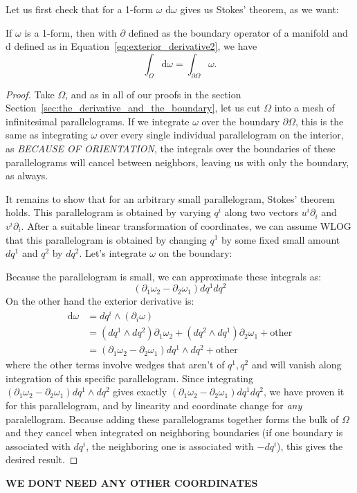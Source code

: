 	Let us first check that for a 1-form $\omega$ $\mathrm d \omega$ gives us Stokes' theorem, as we want:
	
	\begin{theorem}
		If $\omega$ is a 1-form, then with $\partial$ defined as the boundary operator of a manifold and $\mathrm d$ defined as in Equation~\eqref{eq:exterior_derivative2}, we have
		\begin{equation*} 
			\int_\Omega \mathrm d \omega = \int_{\partial \Omega} \omega.
		\end{equation*}
	\end{theorem}
	\begin{proof}
		Take $\Omega$, and as in all of our proofs in the section Section~\ref{sec:the_derivative_and_the_boundary}, let us cut $\Omega$ into a mesh of infinitesimal parallelograms. If we integrate $\omega$ over the boundary $\partial \Omega$, this is the same as integrating $\omega$ over every single individual parallelogram on the interior, as \emph{BECAUSE OF ORIENTATION}, the integrals over the boundaries of these parallelograms will cancel between neighbors, leaving us with only the boundary, as always.
		
		It remains to show that for an arbitrary small parallelogram, Stokes' theorem holds. This parallelogram is obtained by varying $q^i$ along two vectors $u^i \partial_i$ and $v^i \partial_i$. After a suitable linear transformation of coordinates, we can assume WLOG that this parallelogram is obtained by changing $q^1$ by some fixed small amount $dq^1$ and $q^2$ by $dq^2$. Let's integrate $\omega$ on the boundary:
		
		Because the parallelogram is small, we can approximate these integrals as:
		\begin{equation*}
			(\partial_1 \omega_2 - \partial_2 \omega_1) dq^1 dq^2
		\end{equation*}
		On the other hand the exterior derivative is:
		\begin{align*}
			\mathrm d \omega 
			&= dq^i \wedge (\partial_i \omega) \\
			&= (dq^1 \wedge dq^2) \partial_1 \omega_2 + (dq^2 \wedge dq^1)  \partial_2 \omega_1 + \text{other} \\
			&= (\partial_1 \omega_2 - \partial_2 \omega_1) dq^1 \wedge dq^2 + \text{other}
		\end{align*}
		where the other terms involve wedges that aren't of $q^1,q^2$ and will vanish along integration of this specific parallelogram. Since integrating $(\partial_1 \omega_2 - \partial_2 \omega_1) dq^1 \wedge dq^2$ gives exactly $(\partial_1 \omega_2 - \partial_2 \omega_1) dq^1 dq^2$, we have proven it for this parallelogram, and by linearity and coordinate change for \emph{any} paralellogram. Because adding these parallelograms together forms the bulk of $\Omega$ and they cancel when integrated on neighboring boundaries (if one boundary is associated with $dq^i$, the neighboring one is associated with $-dq^i$), this gives the desired result. 
	\end{proof}
	\textbf{WE DONT NEED ANY OTHER COORDINATES}
	
